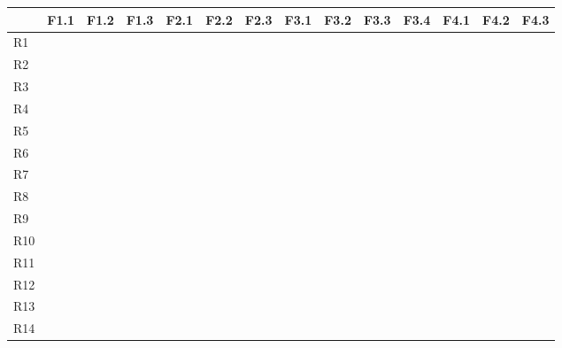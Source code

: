 \begin{center}
\footnotesize
    \begin{longtable}[!htb]{| m{2em} || m{2em} | m{2em}| m{2em}| m{2em}| m{2em}| m{2em}| m{2em}| m{2em}| m{2em}| m{2em}| m{2em}| m{2em}| m{2em}|}
    \hline
    &F1.1 &F1.2 &F1.3 &F2.1 &F2.2 &F2.3 &F3.1 &F3.2 &F3.3 &F3.4 &F4.1 &F4.2 &F4.3\\
    \hline\hline
    R1 & & \cellcolor{gr}{}&\cellcolor{gr}{} &\cellcolor{gr}{} & \cellcolor{gr}{}&\cellcolor{gr}{}&\cellcolor{gr}{} & & & & & & \\
    \hline
    R2 &\cellcolor{gr}{} &\cellcolor{gr}{} & & &\cellcolor{gr}{} & & & & & & & &\\
    \hline
    R3 &\cellcolor{gr}{} & \cellcolor{gr}{}& & &\cellcolor{gr}{} & & & & & & & &\\
    \hline
    R4 &\cellcolor{gr}{} &\cellcolor{gr}{} &\cellcolor{gr}{} & & & & &\cellcolor{gr}{} &\cellcolor{gr}{} & & & &\\
    \hline
    R5 &\cellcolor{gr}{} &\cellcolor{gr}{} &\cellcolor{gr}{} & & & & &\cellcolor{gr}{} &\cellcolor{gr}{} & & & &\\
    \hline
    R6 &\cellcolor{gr}{} &\cellcolor{gr}{} &\cellcolor{gr}{} & & & & &\cellcolor{gr}{} &\cellcolor{gr}{} & & & &\\
    \hline
    R7 &\cellcolor{gr}{} &\cellcolor{gr}{} &\cellcolor{gr}{} & & & & &\cellcolor{gr}{} &\cellcolor{gr}{} & & & &\\
    \hline
    R8 &\cellcolor{gr}{} &\cellcolor{gr}{} &\cellcolor{gr}{} & & & & &\cellcolor{gr}{} &\cellcolor{gr}{} & & & &\\
    \hline
    R9 &\cellcolor{gr}{} &\cellcolor{gr}{} &\cellcolor{gr}{} & & & & &\cellcolor{gr}{} &\cellcolor{gr}{} & & & &\\
    \hline
    R10 &\cellcolor{gr}{} &\cellcolor{gr}{} &\cellcolor{gr}{} & & & & &\cellcolor{gr}{} &\cellcolor{gr}{} & & & &\\
    \hline
    R11 & & & &\cellcolor{gr}{} &\cellcolor{gr}{} & \cellcolor{gr}{}& & & & & & &\\
    \hline
    R12 & & & &\cellcolor{gr}{} &\cellcolor{gr}{} &\cellcolor{gr}{} & & & & & & &\\
    \hline
    R13 &\cellcolor{gr}{} &\cellcolor{gr}{} &\cellcolor{gr}{} & & & & &\cellcolor{gr}{} &\cellcolor{gr}{} & & & &\\
    \hline
    R14 & & & &\cellcolor{gr}{} &\cellcolor{gr}{} &\cellcolor{gr}{} & & & & & & &\\

\end{longtable}
\end{center}

